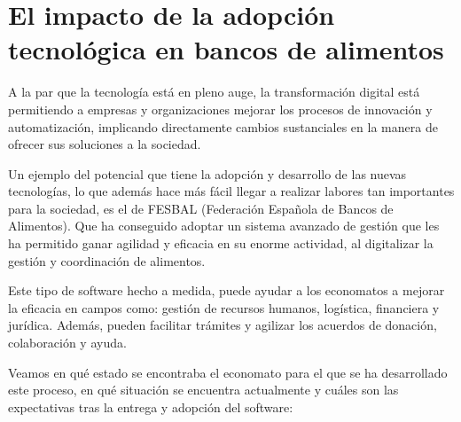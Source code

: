 \section{El impacto de la adopción tecnológica en bancos de alimentos}
A la par que la tecnología está en pleno auge, la transformación digital está permitiendo a empresas y organizaciones mejorar los procesos de innovación y automatización, implicando directamente cambios sustanciales en la manera de ofrecer sus soluciones a la sociedad.
\par Un ejemplo del potencial que tiene la adopción y desarrollo de las nuevas tecnologías, lo que además hace más fácil llegar a realizar labores tan importantes para la sociedad, es el de FESBAL (Federación Española de Bancos de Alimentos). Que ha conseguido adoptar un sistema avanzado de gestión que les ha permitido ganar agilidad y eficacia en su enorme actividad, al digitalizar la gestión y coordinación de alimentos.
\par Este tipo de software hecho a medida, puede ayudar a los economatos a mejorar la eficacia en campos como: gestión de recursos humanos, logística, financiera y jurídica. Además, pueden facilitar trámites y agilizar los acuerdos de donación, colaboración y ayuda.
\par Veamos en qué estado se encontraba el economato para el que se ha desarrollado este proceso, en qué situación se encuentra actualmente y cuáles son las expectativas tras la entrega y adopción del software:
